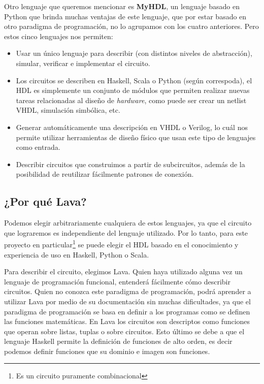 Otro lenguaje que queremos mencionar es \textbf{MyHDL}\cite{MyHDL}, un lenguaje basado en Python que brinda muchas ventajas de este lenguaje, que por estar basado en otro paradigma de programación, no lo agrupamos con los cuatro anteriores. Pero estos cinco lenguajes nos permiten:

\begin{itemize}
\item Usar un único lenguaje para describir (con distintos niveles de abstracción), simular, verificar e implementar el circuito.
\item Los circuitos se describen en Haskell, Scala o Python (según correspoda), el HDL es simplemente un conjunto de módulos que permiten realizar nuevas tareas relacionadas al diseño de \emph{hardware}, como puede ser crear un netlist VHDL, simulación simbólica, etc. 
\item Generar automáticamente una descripción en VHDL o Verilog, lo cuál nos permite utilizar herramientas de diseño físico que usan este tipo de lenguajes como entrada.
\item Describir circuitos que construimos a partir de subcircuitos, además de la posibilidad de reutilizar fácilmente patrones de conexión.
\end{itemize}

\subsection{¿Por qué Lava?}
Podemos elegir arbitrariamente cualquiera de estos lenguajes, ya que el circuito que lograremos es independiente del lenguaje utilizado. Por lo tanto, para este proyecto en particular\footnote{Es un circuito puramente combinacional} se puede elegir el HDL basado en el conocimiento y experiencia de uso en Haskell, Python o Scala.

Para describir el circuito, elegimos Lava. Quien haya utilizado alguna vez un lenguaje de programación funcional, entenderá fácilmente cómo describir circuitos. Quien no conozca este paradigma de programación, podrá aprender a utilizar Lava por medio de su documentación\cite{Lava-tutorial} sin muchas dificultades, ya que el paradigma de programación se basa en definir a los programas como se definen las funciones matemáticas. En Lava los circuitos son descriptos como funciones que operan sobre listas, tuplas o sobre circuitos. Esto último se debe a que el lenguaje Haskell permite la definición de funciones de alto orden, es decir podemos definir funciones que su dominio e imagen son funciones. 

